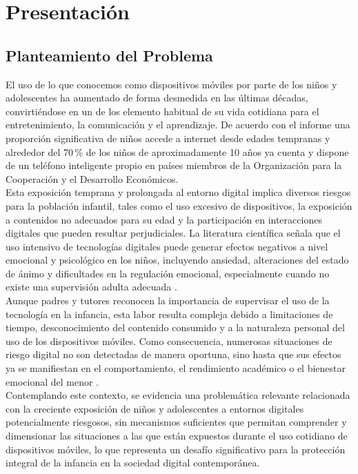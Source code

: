 \chapter[Presentacion]{Presentación}
\label{cp:introduction}

\insertminitoc
\parindent0pt

\section{Planteamiento del Problema}
El uso de lo que conocemos como dispositivos móviles por parte de los niños y adolescentes ha aumentado de forma desmedida en las últimas décadas, convirtiéndose en un de los elemento habitual de su vida cotidiana para el entretenimiento, la comunicación y el aprendizaje. De acuerdo con el informe \cite{noauthor_full_2025} una proporción significativa de niños accede a internet desde edades tempranas y alrededor del 70\,\% de los niños de aproximadamente 10 años ya cuenta y dispone de un teléfono inteligente propio en países miembros de la Organización para la Cooperación y el Desarrollo Económicos.\\

Esta exposición temprana y prolongada al entorno digital implica diversos riesgos para la población infantil, tales como el uso excesivo de dispositivos, la exposición a contenidos no adecuados para su edad y la participación en interacciones digitales que pueden resultar perjudiciales. La literatura científica señala que el uso intensivo de tecnologías digitales puede generar efectos negativos a nivel emocional y psicológico en los niños, incluyendo ansiedad, alteraciones del estado de ánimo y dificultades en la regulación emocional, especialmente cuando no existe una supervisión adulta adecuada \cite{limone_psychological_2021}.\\

Aunque padres y tutores reconocen la importancia de supervisar el uso de la tecnología en la infancia, esta labor resulta compleja debido a limitaciones de tiempo, desconocimiento del contenido consumido y a la naturaleza personal del uso de los dispositivos móviles. Como consecuencia, numerosas situaciones de riesgo digital no son detectadas de manera oportuna, sino hasta que sus efectos ya se manifiestan en el comportamiento, el rendimiento académico o el bienestar emocional del menor \cite{noauthor_full_2025}.\\

Contemplando este contexto, se evidencia una problemática relevante relacionada con la creciente exposición de niños y adolescentes a entornos digitales potencialmente riesgosos, sin mecanismos suficientes que permitan comprender y dimensionar las situaciones a las que están expuestos durante el uso cotidiano de dispositivos móviles, lo que representa un desafío significativo para la protección integral de la infancia en la sociedad digital contemporánea.\\

